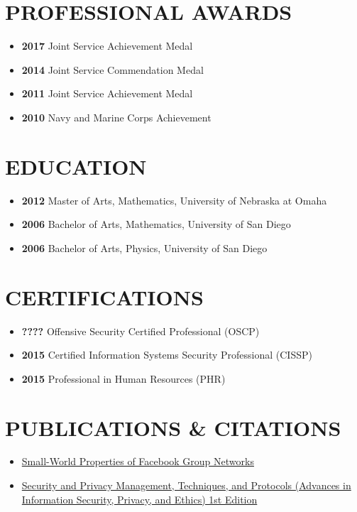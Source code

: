 \documentclass[10pt]{article}
\def\tightlist{}
\begin{document}
\section{PROFESSIONAL AWARDS}\label{professional-awards}

\begin{itemize}
\tightlist
\item
  \textbf{2017} Joint Service Achievement Medal
\item
  \textbf{2014} Joint Service Commendation Medal
\item
  \textbf{2011} Joint Service Achievement Medal
\item
  \textbf{2010} Navy and Marine Corps Achievement
\end{itemize}

\section{EDUCATION}\label{education}

\begin{itemize}
\tightlist
\item
  \textbf{2012} Master of Arts, Mathematics, University of Nebraska at
  Omaha
\item
  \textbf{2006} Bachelor of Arts, Mathematics, University of San Diego
\item
  \textbf{2006} Bachelor of Arts, Physics, University of San Diego
\end{itemize}

\section{CERTIFICATIONS}\label{certifications}

\begin{itemize}
\tightlist
\item
  \textbf{????} Offensive Security Certified Professional (OSCP)
\item
  \textbf{2015} Certified Information Systems Security Professional
  (CISSP)
\item
  \textbf{2015} Professional in Human Resources (PHR)
\end{itemize}

\section{PUBLICATIONS \& CITATIONS}\label{publications-citations}

\begin{itemize}
\tightlist
\item
  \href{http://wpmedia.wolfram.com/uploads/sites/13/2018/02/23-3-1.pdf}{Small-World
  Properties of Facebook Group Networks}
\item
  \href{https://smile.amazon.com/gp/product/1522555838/ref=ppx_yo_dt_b_asin_title_o02_s00?ie=UTF8\&psc=1}{Security
  and Privacy Management, Techniques, and Protocols (Advances in
  Information Security, Privacy, and Ethics) 1st Edition}
\end{itemize}
\end{document}
